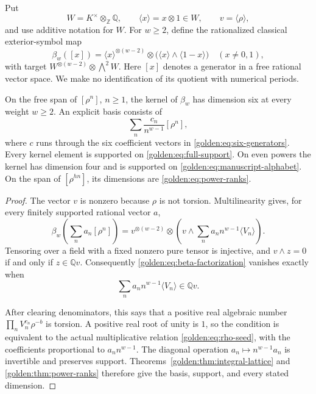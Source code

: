 Put
\[
 W=K^\times\otimes_{\mathbb Z}\mathbb Q,
 \qquad\langle x\rangle=x\otimes1\in W,
 \qquad v=\langle\rho\rangle,
\]
and use additive notation for $W$.
For $w\ge2$, define the rationalized classical exterior-symbol map
\begin{equation}
 \beta_w([x])=
 \langle x\rangle^{\otimes(w-2)}\otimes
 \bigl(\langle x\rangle\wedge\langle1-x\rangle\bigr)
 \quad (x\ne0,1),
 \label{golden:eq:beta-definition}
\end{equation}
with target $W^{\otimes(w-2)}\otimes\bigwedge^2W$.
Here $[x]$ denotes a generator in a free rational vector space.
We make no identification of its quotient with numerical periods.

\begin{theorem}
\label{golden:thm:symbol-kernel}
On the free span of $[\rho^n]$, $n\ge1$, the kernel of $\beta_w$
has dimension six at every weight $w\ge2$.
An explicit basis consists of
\begin{equation}
 \sum_n\frac{c_n}{n^{w-1}}[\rho^n],
 \label{golden:eq:weighted-seed}
\end{equation}
where $c$ runs through the six coefficient vectors in
\eqref{golden:eq:six-generators}.
Every kernel element is supported on
\eqref{golden:eq:full-support}.
On even powers the kernel has dimension four and is supported on
\eqref{golden:eq:manuscript-alphabet}.
On the span of $[\rho^{hn}]$, its dimensions are
\eqref{golden:eq:power-ranks}.
\end{theorem}

\begin{proof}
The vector $v$ is nonzero because $\rho$ is not torsion.
Multilinearity gives, for every finitely supported rational vector $a$,
\begin{equation}
 \beta_w\!\left(\sum_n a_n[\rho^n]\right)
 =v^{\otimes(w-2)}\otimes
 \left(v\wedge\sum_n a_n n^{w-1}\langle V_n\rangle\right).
 \label{golden:eq:beta-factorization}
\end{equation}
Tensoring over a field with a fixed nonzero pure tensor is injective,
and $v\wedge z=0$ if and only if $z\in\mathbb Qv$.
Consequently \eqref{golden:eq:beta-factorization} vanishes exactly
when
\begin{equation}
 \sum_n a_n n^{w-1}\langle V_n\rangle\in\mathbb Qv.
 \label{golden:eq:weighted-line-test}
\end{equation}

After clearing denominators, this says that a positive real algebraic
number $\prod_nV_n^{c_n}\rho^{-b}$ is torsion.  A positive real
root of unity is $1$, so the condition is equivalent to the actual
multiplicative relation \eqref{golden:eq:rho-seed}, with the
coefficients proportional to $a_n n^{w-1}$.
The diagonal operation $a_n\mapsto n^{w-1}a_n$ is invertible and
preserves support.  Theorems~\ref{golden:thm:integral-lattice}
and \ref{golden:thm:power-ranks} therefore give the basis, support,
and every stated dimension.
\end{proof}

